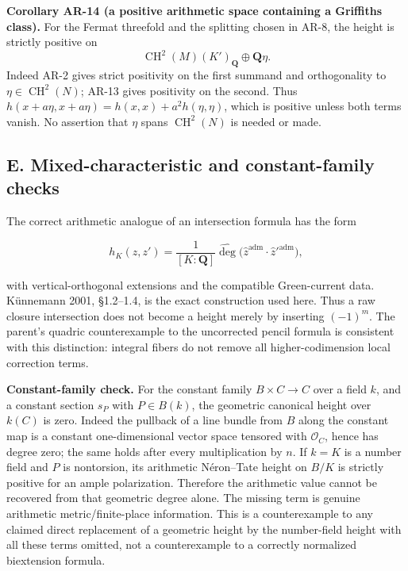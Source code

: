 \documentclass[11pt,a4paper]{article}
\begin{document}
\textbf{Corollary AR-14 (a positive arithmetic space containing a
Griffiths class).} For the Fermat threefold and the splitting chosen in
AR-8, the height is strictly positive on \[
\operatorname{CH}^2(M)(K')_{\mathbf Q}\oplus\mathbf Q\eta.
\] Indeed AR-2 gives strict positivity on the first summand and
orthogonality to \(\eta\in\operatorname{CH}^2(N)\); AR-13 gives
positivity on the second. Thus
\(h(x+a\eta,x+a\eta)=h(x,x)+a^2h(\eta,\eta)\), which is positive unless
both terms vanish. No assertion that \(\eta\) spans
\(\operatorname{CH}^2(N)\) is needed or made.

\subsection{E. Mixed-characteristic and constant-family
checks}\label{e.-mixed-characteristic-and-constant-family-checks}

The correct arithmetic analogue of an intersection formula has the form

\[
h_K(z,z')=\frac1{[K:\mathbf Q]}\widehat{\deg}
 \bigl(\widehat z^{\mathrm{adm}}\cdot\widehat z'^{\mathrm{adm}}\bigr),
\tag{AR.6}
\]

with vertical-orthogonal extensions and the compatible Green-current
data. Künnemann 2001, §1.2--1.4, is the exact construction used here.
Thus a raw closure intersection does not become a height merely by
inserting \((-1)^m\). The parent's quadric counterexample to the
uncorrected pencil formula is consistent with this distinction: integral
fibers do not remove all higher-codimension local correction terms.

\textbf{Constant-family check.} For the constant family
\(B\times C\to C\) over a field \(k\), and a constant section \(s_P\)
with \(P\in B(k)\), the geometric canonical height over \(k(C)\) is
zero. Indeed the pullback of a line bundle from \(B\) along the constant
map is a constant one-dimensional vector space tensored with
\(\mathcal O_C\), hence has degree zero; the same holds after every
multiplication by \(n\). If \(k=K\) is a number field and \(P\) is
nontorsion, its arithmetic Néron--Tate height on \(B/K\) is strictly
positive for an ample polarization. Therefore the arithmetic value
cannot be recovered from that geometric degree alone. The missing term
is genuine arithmetic metric/finite-place information. This is a
counterexample to any claimed direct replacement of a geometric height
by the number-field height with all these terms omitted, not a
counterexample to a correctly normalized biextension formula.
\end{document}
